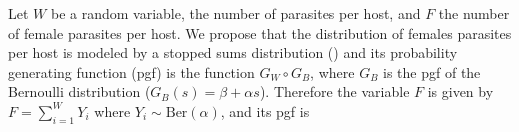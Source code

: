 \documentclass[12pt,a4paper]{article}
\theoremstyle{plain}%
\theoremstyle{definition}
\theoremstyle{remark}
\begin{document}
	
	Let $W$ be a random variable, the number of parasites per host, and %
	$F$ the number of female parasites per host.
	We propose that the distribution of females parasites per host is modeled by a stopped sums distribution (\cite{johnson2005univariate}) and its probability generating function (pgf) is the function $G_W \circ G_B$, where $G_B$  is the pgf of the Bernoulli distribution ($G_B(s)=\beta + \alpha s$)\cite{johnson2005univariate}. 
	Therefore the variable $F$ is given by $F=\sum_{i=1} ^W Y_i$ where $Y_i\sim \mathrm{Ber}(\alpha)$, and its pgf is 
	
	
\end{document}
